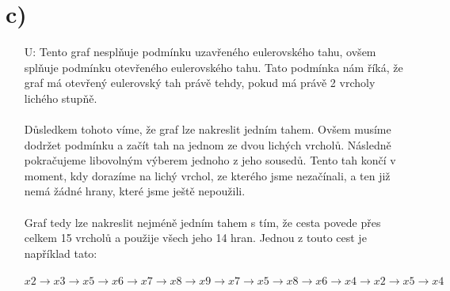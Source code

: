 \documentclass[a4paper, 10pt, oneside]{article}       %
\begin{document}
\section*{c)}
\begin{enumerate}
    \item [U:]  Tento graf nesplňuje podmínku uzavřeného eulerovského tahu, ovšem splňuje                 podmínku otevřeného eulerovského tahu. Tato podmínka nám říká, že graf má                 otevřený eulerovský tah právě tehdy, pokud má právě 2 vrcholy lichého stupňě.
                \\\\
                Důsledkem tohoto víme, že graf lze nakreslit jedním tahem. Ovšem musíme dodržet podmínku a začít tah na jednom ze dvou lichých vrcholů. Následně pokračujeme libovolným výberem jednoho z jeho sousedů. Tento tah končí v moment, kdy dorazíme na lichý vrchol, ze kterého jsme nezačínali, a ten již nemá žádné hrany, které jsme ještě nepoužili.
                \\\\
                Graf tedy lze nakreslit nejméně jedním tahem s tím, že cesta povede přes celkem 15 vrcholů a použije všech jeho 14 hran. Jednou z touto cest je například tato:
                \\\\
                $$ x2 \rightarrow x3 \rightarrow x5 \rightarrow x6 \rightarrow x7 \rightarrow x8 \rightarrow x9 \rightarrow x7 \rightarrow x5 \rightarrow x8 \rightarrow x6 \rightarrow x4 \rightarrow x2 \rightarrow x5 \rightarrow x4 $$
\end{enumerate}
\end{document}
